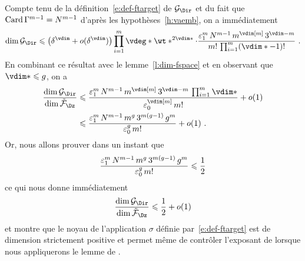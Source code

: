 Compte tenu de la définition~\eqref{e:def-ftarget} de \( \ftarget \) et du
fait que \( \operatorname{Card} \Gamma^{m-1} = N^{m-1} \) d'après les
hypothèses~\ref{h:vaemb}, on a immédiatement
\begin{equation}
  \dim \ftarget
  \le
  \bigl(\delta^\vdim + o(\delta^\vdim)\bigr)
  \prod\fctrange \vdeg* \wt*^{2\vdim*}
  \cdot
  \frac {
    \epsi^\puiss
    \, \nclmaps^{\puiss-1}
    \, \puiss^{\vdim[\puiss]}
    \, 3^{\vdim - \puiss}
  }{
    \puiss!
    \, \prod\fctrange (\vdim* - 1)!
  }
  \pmm.
\end{equation}
En combinant ce résultat avec le lemme~\ref{l:dim-fspace} et en observant que
\( \vdim* \le \genre \), on a
\begin{align}
  \frac {\dim \ftarget} {\dim \fspace}
  & \le
  \frac {
    \epsi^\puiss
    \, \nclmaps^{\puiss-1}
    \, \puiss^{\vdim[\puiss]}
    \, 3^{\vdim - \puiss}
    \, \prod\fctrange \vdim*
  }{
    \epsz^{\vdim[\puiss]}
    \, \puiss!
  }
  + o(1)
  \\ & \le
  \frac {
    \epsi^\puiss
    \, \nclmaps^{\puiss-1}
    \, \puiss ^{\genre}
    \, 3 ^{\puiss (\genre-1)}
    \, \genre^\puiss
  }{
    \epsz^\genre
    \, \puiss!
  }
  + o(1)
  \pmm.
\end{align}
Or, nous allons prouver dans un instant que
\begin{equation} \label{e:ct-eps*-siegel}
  \frac {
    \varepsilon\sb1^m
    \, N^{m-1}
    \, m ^{g}
    \, 3 ^{m (g-1)}
    \, g^m
  }{
    \varepsilon\sb0^g
    \, m!
  }
  \leqslant
  \frac12
\end{equation}
ce qui nous donne immédiatement
\begin{equation} \label{e:good-codim}
  \frac {\dim \ftarget} {\dim \fspace}
  \le
  \frac12
  + o(1)
\end{equation}
et montre que le noyau de l'application \( \sigma \) définie
par~\eqref{e:def-ftarget} est de dimension strictement positive et permet même
de contrôler l'exposant de  lorsque nous appliquerons le lemme
de \TS.


